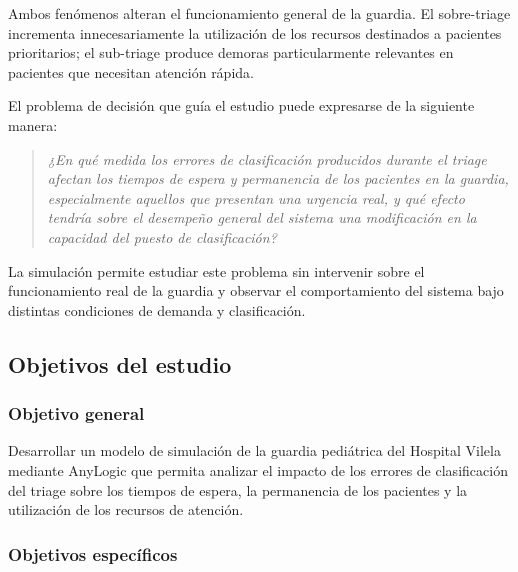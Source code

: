 Ambos fenómenos alteran el funcionamiento general de la guardia. El
sobre-triage incrementa innecesariamente la utilización de los recursos
destinados a pacientes prioritarios; el sub-triage produce demoras
particularmente relevantes en pacientes que necesitan atención rápida.

El problema de decisión que guía el estudio puede expresarse de la siguiente
manera:

\begin{quote}
\textit{¿En qué medida los errores de clasificación producidos durante el
triage afectan los tiempos de espera y permanencia de los pacientes en la
guardia, especialmente aquellos que presentan una urgencia real, y qué efecto
tendría sobre el desempeño general del sistema una modificación en la
capacidad del puesto de clasificación?}
\end{quote}

La simulación permite estudiar este problema sin intervenir sobre el
funcionamiento real de la guardia y observar el comportamiento del sistema
bajo distintas condiciones de demanda y clasificación.

\subsection{Objetivos del estudio}

\subsubsection*{Objetivo general}

Desarrollar un modelo de simulación de la guardia pediátrica del Hospital
Vilela mediante AnyLogic que permita analizar el impacto de los errores de
clasificación del triage sobre los tiempos de espera, la permanencia de los
pacientes y la utilización de los recursos de atención.

\subsubsection*{Objetivos específicos}

